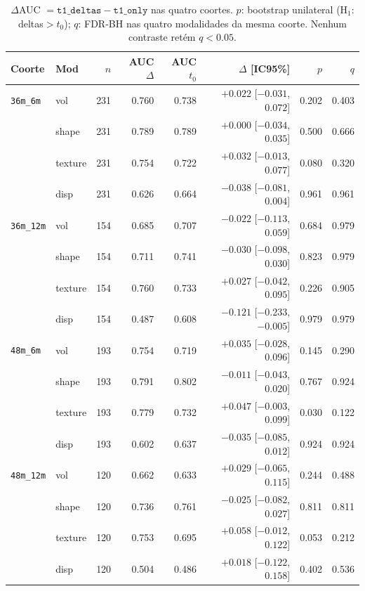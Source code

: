 \documentclass[review]{elsarticle}
\newcommand{\code}[1]{\texttt{#1}}
\begin{document}
	\begin{table}[htbp]
		\centering
		\footnotesize
		\caption{$\Delta$AUC $=\code{t1\_deltas}-\code{t1\_only}$ nas quatro coortes.
			$p$: bootstrap unilateral (H$_1$: deltas$>t_0$); $q$: FDR-BH nas quatro modalidades da mesma coorte.
			Nenhum contraste retém $q<0.05$.}
		\label{tab:gradient_stats}
		\begin{tabular}{llrrrrrr}
			\toprule
			Coorte & Mod & $n$ & AUC $\Delta$ & AUC $t_0$ & $\Delta$ [IC95\%] & $p$ & $q$ \\
			\midrule
			\code{36m\_6m}
			& vol     & 231 & 0.760 & 0.738 & $+0.022$ [$-0.031$, $0.072$] & 0.202 & 0.403 \\
			& shape   & 231 & 0.789 & 0.789 & $+0.000$ [$-0.034$, $0.035$] & 0.500 & 0.666 \\
			& texture & 231 & 0.754 & 0.722 & $+0.032$ [$-0.013$, $0.077$] & 0.080 & 0.320 \\
			& disp    & 231 & 0.626 & 0.664 & $-0.038$ [$-0.081$, $0.004$] & 0.961 & 0.961 \\
			\midrule
			\code{36m\_12m}
			& vol     & 154 & 0.685 & 0.707 & $-0.022$ [$-0.113$, $0.059$] & 0.684 & 0.979 \\
			& shape   & 154 & 0.711 & 0.741 & $-0.030$ [$-0.098$, $0.030$] & 0.823 & 0.979 \\
			& texture & 154 & 0.760 & 0.733 & $+0.027$ [$-0.042$, $0.095$] & 0.226 & 0.905 \\
			& disp    & 154 & 0.487 & 0.608 & $-0.121$ [$-0.233$, $-0.005$] & 0.979 & 0.979 \\
			\midrule
			\code{48m\_6m}
			& vol     & 193 & 0.754 & 0.719 & $+0.035$ [$-0.028$, $0.096$] & 0.145 & 0.290 \\
			& shape   & 193 & 0.791 & 0.802 & $-0.011$ [$-0.043$, $0.020$] & 0.767 & 0.924 \\
			& texture & 193 & 0.779 & 0.732 & $+0.047$ [$-0.003$, $0.099$] & 0.030 & 0.122 \\
			& disp    & 193 & 0.602 & 0.637 & $-0.035$ [$-0.085$, $0.012$] & 0.924 & 0.924 \\
			\midrule
			\code{48m\_12m}
			& vol     & 120 & 0.662 & 0.633 & $+0.029$ [$-0.065$, $0.115$] & 0.244 & 0.488 \\
			& shape   & 120 & 0.736 & 0.761 & $-0.025$ [$-0.082$, $0.027$] & 0.811 & 0.811 \\
			& texture & 120 & 0.753 & 0.695 & $+0.058$ [$-0.012$, $0.122$] & 0.053 & 0.212 \\
			& disp    & 120 & 0.504 & 0.486 & $+0.018$ [$-0.122$, $0.158$] & 0.402 & 0.536 \\
			\bottomrule
		\end{tabular}
	\end{table}
	
\end{document}
